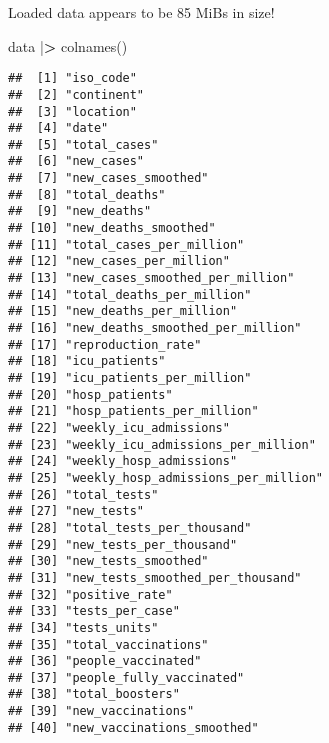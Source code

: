\documentclass[
]{article}
\newenvironment{Shaded}{\begin{snugshade}}{\end{snugshade}}
\newcommand{\ErrorTok}[1]{\textcolor[rgb]{0.64,0.00,0.00}{\textbf{#1}}}
\newcommand{\FunctionTok}[1]{\textcolor[rgb]{0.00,0.00,0.00}{#1}}
\newcommand{\NormalTok}[1]{#1}
\newcommand{\SpecialCharTok}[1]{\textcolor[rgb]{0.00,0.00,0.00}{#1}}
\begin{document}
Loaded data appears to be 85 MiBs in size!

\begin{Shaded}
\begin{Highlighting}[]
\NormalTok{data }\SpecialCharTok{|}\ErrorTok{\textgreater{}} \FunctionTok{colnames}\NormalTok{()}
\end{Highlighting}
\end{Shaded}

\begin{verbatim}
##  [1] "iso_code"                                  
##  [2] "continent"                                 
##  [3] "location"                                  
##  [4] "date"                                      
##  [5] "total_cases"                               
##  [6] "new_cases"                                 
##  [7] "new_cases_smoothed"                        
##  [8] "total_deaths"                              
##  [9] "new_deaths"                                
## [10] "new_deaths_smoothed"                       
## [11] "total_cases_per_million"                   
## [12] "new_cases_per_million"                     
## [13] "new_cases_smoothed_per_million"            
## [14] "total_deaths_per_million"                  
## [15] "new_deaths_per_million"                    
## [16] "new_deaths_smoothed_per_million"           
## [17] "reproduction_rate"                         
## [18] "icu_patients"                              
## [19] "icu_patients_per_million"                  
## [20] "hosp_patients"                             
## [21] "hosp_patients_per_million"                 
## [22] "weekly_icu_admissions"                     
## [23] "weekly_icu_admissions_per_million"         
## [24] "weekly_hosp_admissions"                    
## [25] "weekly_hosp_admissions_per_million"        
## [26] "total_tests"                               
## [27] "new_tests"                                 
## [28] "total_tests_per_thousand"                  
## [29] "new_tests_per_thousand"                    
## [30] "new_tests_smoothed"                        
## [31] "new_tests_smoothed_per_thousand"           
## [32] "positive_rate"                             
## [33] "tests_per_case"                            
## [34] "tests_units"                               
## [35] "total_vaccinations"                        
## [36] "people_vaccinated"                         
## [37] "people_fully_vaccinated"                   
## [38] "total_boosters"                            
## [39] "new_vaccinations"                          
## [40] "new_vaccinations_smoothed"                 

\end{verbatim}
\end{document}
